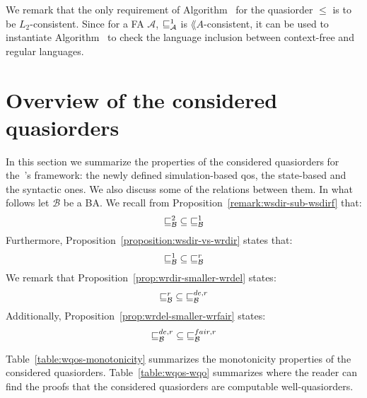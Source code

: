 We remark that the only requirement of Algorithm~ for the quasiorder
$\leq$ is to be $L_2$-consistent.
Since for a FA $\mathcal{A}$, $\sqsubseteq^1_{\mathcal{A}}$ is $\lang{A}$-consistent, it
can be used to instantiate Algorithm~ to check the language inclusion
between context-free and regular languages.

\section{Overview of the considered quasiorders}
\label{sec:overview-qos}

In this section we summarize the properties of the considered quasiorders
for the~\cite{ganty2020omegalang}'s framework: the newly defined simulation-based qos,
the state-based and the syntactic ones.
We also discuss some of the relations between them.
In what follows let $\mathcal{B}$ be a BA.
We recall from Proposition~\ref{remark:wsdir-sub-wsdirf} that:
\[ \mathord{\sqsubseteq_{\mathcal{B}}^{2}} \subseteq \mathord{\sqsubseteq^1_{\mathcal{B}}} \]
Furthermore, Proposition~\ref{proposition:wsdir-vs-wrdir} states that:
\[ \mathord{\sqsubseteq^1_{\mathcal{B}}} \subseteq \mathord{\sqsubseteq_{\mathcal{B}}^r} \]
We remark that Proposition~\ref{prop:wrdir-smaller-wrdel} states:
\[ \mathord{\sqsubseteq_{\mathcal{B}}^r} \subseteq \mathord{\sqsubseteq_{\mathcal{B}}^{de,r}} \]
Additionally, Proposition~\ref{prop:wrdel-smaller-wrfair} states:
\[ \mathord{\sqsubseteq_{\mathcal{B}}^{de,r}} \subseteq \mathord{\sqsubseteq_{\mathcal{B}}^{fair,r}} \]

Table~\ref{table:wqos-monotonicity} summarizes the monotonicity properties
of the considered quasiorders.
Table~\ref{table:wqos-wqo} summarizes where the reader can find the proofs
that the considered quasiorders are computable well-quasiorders.

